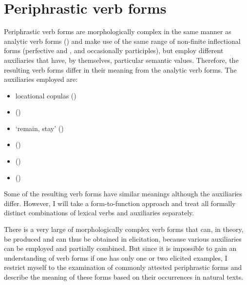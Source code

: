 \chapter{Periphrastic verb forms}
\label{cpt:Periphrastic verb forms}

Periphrastic verb forms are morphologically complex in the same manner as analytic verb forms () and make use of the same range of non-finite inflectional forms (perfective and , and occasionally participles), but employ different auxiliaries that have, by themselves, particular semantic values. Therefore, the resulting verb forms differ in their meaning from the analytic verb forms. The auxiliaries employed are:

\begin{itemize}
	\item	locational copulas ()
	\item	{}  ()
	\item	{} `remain, stay' ()
	\item	{}  ()
	\item	{}  ()
	\item	{}  ()
\end{itemize}

Some of the resulting verb forms have similar meanings although the auxiliaries differ. However, I will take a form-to-function approach and treat all formally distinct combinations of lexical verbs and auxiliaries separately.

There is a very large  of morphologically complex verb forms that can, in theory, be produced and can thus be obtained in elicitation, because various auxiliaries can be employed and partially combined. But since it is impossible to gain an understanding of verb forms if one has only one or two elicited examples, I restrict myself to the examination of commonly attested periphrastic forms and describe the meaning of these forms based on their occurrences in natural texts.

